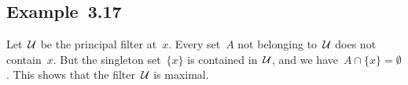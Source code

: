 \subsection{Example~3.17}

Let~$\mathcal{U}$ be the principal filter at~$x$.
Every set~$A$ not belonging to~$\mathcal{U}$ does not contain~$x$.
But the singleton set~$\{ x \}$ is contained in~$\mathcal{U}$, and we have~$A ∩ \{ x \} = ∅$.
This shows that the filter~$\mathcal{U}$ is maximal.
